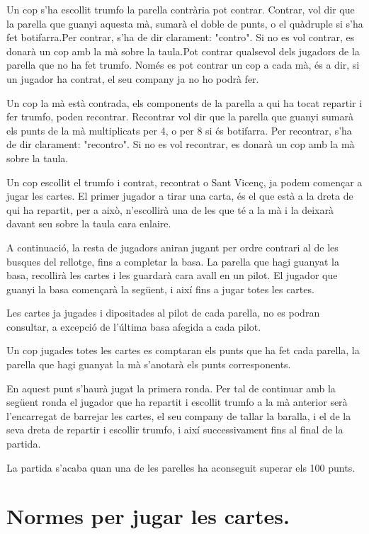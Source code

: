 Un cop s'ha escollit trumfo la parella contrària pot contrar. Contrar, vol dir que la parella que guanyi aquesta mà, sumarà el doble de punts, o el quàdruple si s'ha fet botifarra.Per contrar, s'ha de dir clarament: "contro". Si no es vol contrar, es donarà un cop amb la mà sobre la taula.Pot contrar qualsevol dels jugadors de la parella que no ha fet trumfo. Només es pot contrar un cop a cada mà, és a dir, si un jugador ha contrat, el seu company ja no ho podrà fer.

Un cop la mà està contrada, els components de la parella a qui ha tocat repartir i fer trumfo, poden recontrar. Recontrar vol dir que la parella que guanyi sumarà els punts de la mà multiplicats per 4, o per 8 si és botifarra. Per recontrar, s'ha de dir clarament: "recontro". Si no es vol recontrar, es donarà un cop amb la mà sobre la taula.


Un cop escollit el trumfo i contrat, recontrat o Sant Vicenç, ja podem començar a jugar les cartes. El primer jugador a tirar una carta, és el que està a la dreta de qui ha repartit, per a això, n'escollirà una de les que té a la mà i la deixarà davant seu sobre la taula cara enlaire.

A continuació, la resta de jugadors aniran jugant per ordre contrari al de les busques del rellotge, fins a completar la basa. La parella que hagi guanyat la basa, recollirà les cartes i les guardarà cara avall en un pilot. El jugador que guanyi la basa començarà la següent, i així fins a jugar totes les cartes.

Les cartes ja jugades i dipositades al pilot de cada parella, no es podran consultar, a excepció de l'última basa afegida a cada pilot.

Un cop jugades totes les cartes es comptaran els punts que ha fet cada parella, la parella que hagi guanyat la mà s'anotarà els punts corresponents.

En aquest punt s'haurà jugat la primera ronda. Per tal de continuar amb la següent ronda el jugador que ha repartit i escollit trumfo a la mà anterior serà l'encarregat de barrejar les cartes, el seu company de tallar la baralla, i el de la seva dreta de repartir i escollir trumfo, i així successivament fins al final de la partida.

La partida s'acaba quan una de les parelles ha aconseguit superar els 100 punts.

\section{Normes per jugar les cartes.}

